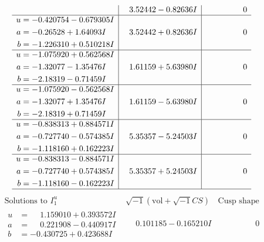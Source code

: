 \documentclass[1p]{elsarticle_modified}
\theoremstyle{definition}
\newcommand{\I}{\sqrt{-1}}
\begin{document}
$$\begin{array}{c|c|c}
 & \phantom{-}3.52442 - 0.82636 I & \phantom{-0.000000 } 0 \\ \hline\begin{aligned}
u &= -0.420754 - 0.679305 I \\
a &= -0.26528 + 1.64093 I \\
b &= -1.226310 + 0.510218 I\end{aligned}
 & \phantom{-}3.52442 + 0.82636 I & \phantom{-0.000000 } 0 \\ \hline\begin{aligned}
u &= -1.075920 + 0.562568 I \\
a &= -1.32077 - 1.35476 I \\
b &= -2.18319 - 0.71459 I\end{aligned}
 & \phantom{-}1.61159 + 5.63980 I & \phantom{-0.000000 } 0 \\ \hline\begin{aligned}
u &= -1.075920 - 0.562568 I \\
a &= -1.32077 + 1.35476 I \\
b &= -2.18319 + 0.71459 I\end{aligned}
 & \phantom{-}1.61159 - 5.63980 I & \phantom{-0.000000 } 0 \\ \hline\begin{aligned}
u &= -0.838313 + 0.884571 I \\
a &= -0.727740 - 0.574385 I \\
b &= -1.118160 + 0.162223 I\end{aligned}
 & \phantom{-}5.35357 - 5.24503 I & \phantom{-0.000000 } 0 \\ \hline\begin{aligned}
u &= -0.838313 - 0.884571 I \\
a &= -0.727740 + 0.574385 I \\
b &= -1.118160 - 0.162223 I\end{aligned}
 & \phantom{-}5.35357 + 5.24503 I & \phantom{-0.000000 } 0\\
 \hline 
 \end{array}$$\newpage$$\begin{array}{c|c|c}  
\text{Solutions to }I^u_{1}& \I (\text{vol} + \sqrt{-1}CS) & \text{Cusp shape}\\
 \hline 
\begin{aligned}
u &= \phantom{-}1.159010 + 0.393572 I \\
a &= \phantom{-}0.221908 - 0.440917 I \\
b &= -0.430725 + 0.423688 I\end{aligned}
 & \phantom{-}0.101185 - 0.165210 I & \phantom{-0.000000 } 0 \\ \hline\begin{aligned}

\end{aligned}
\end{array}$$
\end{document}
